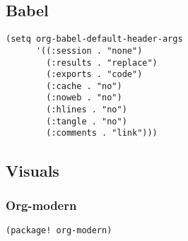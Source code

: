 \documentclass[c]{article}
\theoremstyle{plain}%
\theoremstyle{definition}
\theoremstyle{remark}
\begin{document}
\subsection{Babel}
\label{sec:orgac94d3b}
\begin{verbatim}
(setq org-babel-default-header-args
      '((:session . "none")
        (:results . "replace")
        (:exports . "code")
        (:cache . "no")
        (:noweb . "no")
        (:hlines . "no")
        (:tangle . "no")
        (:comments . "link")))
\end{verbatim}
\subsection{Visuals}
\label{sec:org240c5fe}
\subsubsection{Org-modern}
\label{sec:org21dc333}
\begin{verbatim}
(package! org-modern)
\end{verbatim}
\end{document}
